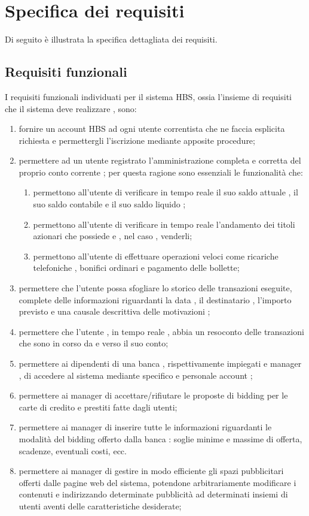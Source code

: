 
\section{Specifica dei requisiti}

Di seguito \`e illustrata la specifica dettagliata dei requisiti.

\subsection{Requisiti funzionali}

I requisiti funzionali individuati per il sistema HBS, ossia l'insieme di requisiti che il sistema deve realizzare , sono:
\begin{enumerate}
\item fornire un account HBS ad ogni utente correntista che ne faccia esplicita richiesta e permettergli l'iscrizione mediante apposite procedure;
\item permettere ad un utente registrato l'amministrazione completa e corretta del proprio conto corrente ; per questa ragione sono essenziali le funzionalità che:
\begin{enumerate}
\item permettono all'utente di verificare in tempo reale il suo saldo attuale , il suo saldo contabile e il suo saldo liquido ;
\item permettono all'utente di verificare in tempo reale l'andamento dei titoli azionari che possiede e , nel caso , venderli;
\item permettono all'utente di effettuare operazioni veloci come ricariche telefoniche , bonifici ordinari e pagamento delle bollette;
\end{enumerate}

\item permettere che l'utente possa sfogliare lo storico delle transazioni eseguite, complete delle informazioni riguardanti la data , il destinatario , l'importo previsto e una causale descrittiva delle motivazioni ;
\item permettere che l'utente , in tempo reale , abbia un resoconto delle transazioni che sono in corso da e verso il suo conto;

\item permettere ai dipendenti di una banca , rispettivamente impiegati e manager , di accedere al sistema mediante specifico e personale account ;

\item permettere ai manager di accettare/rifiutare le proposte di bidding per le carte di credito e prestiti fatte dagli utenti;
\item permettere ai manager di inserire tutte le informazioni riguardanti le modalità del bidding offerto dalla banca : soglie minime e massime di offerta, scadenze, eventuali costi, ecc.
\item permettere ai manager di gestire in modo efficiente gli spazi pubblicitari offerti dalle pagine web del sistema, potendone arbitrariamente modificare i contenuti e indirizzando determinate pubblicità ad determinati insiemi di utenti aventi delle caratteristiche desiderate;


\end{enumerate}
